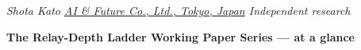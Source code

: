 \vspace{0.1em}
{\centering\scriptsize\itshape Shota Kato \quad\textbullet\quad \href{https://aiandfuture.co.jp}{AI \& Future Co., Ltd., Tokyo, Japan} \quad\textbullet\quad Independent research\par}
\vspace{0.2em}




\endgroup
\endgroup


\clearpage
{}
\thispagestyle{plain}
\singlespacing
\enlargethispage{3cm}
\begin{center}
{\fontsize{17pt}{20pt}\selectfont\bfseries The Relay-Depth Ladder Working Paper Series --- at a glance}
\end{center}
\vspace{-1.0em}

